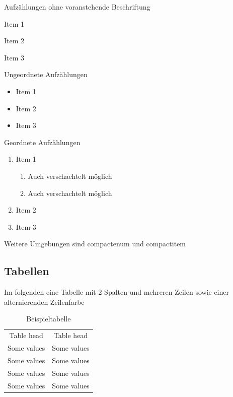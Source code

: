 \documentclass[\maintextsize, \papersize, fleqn, xcolor=dvipsnames]{scrartcl}
\begin{document}
Aufzählungen ohne voranstehende Beschriftung
	
\begin{description}
	\item{Item 1}
	\item{Item 2}
	\item{Item 3}
\end{description}
	
Ungeordnete Aufzählungen
	
\begin{itemize}
	\item{Item 1}
	\item{Item 2}
	\item{Item 3}
\end{itemize}
	
Geordnete Aufzählungen 
	
\begin{enumerate} %
	\item{Item 1}
	\begin{enumerate}
		\item Auch verschachtelt möglich
		\item Auch verschachtelt möglich
	\end{enumerate}
	\item{Item 2}
	\item{Item 3}
\end{enumerate}
	
Weitere Umgebungen sind compactenum und compactitem
	
\subsection{Tabellen}\label{subsec:tables}
	
Im folgenden eine Tabelle mit 2 Spalten und mehreren Zeilen sowie einer alternierenden Zeilenfarbe
	
\begin{table}[H]
	\centering
	\caption{Beispieltabelle}
	\label{tab:test}
	\begin{tabular}{|c|c|}
    	\rowcolor{gray!50}
    	\hline
    	Table head & Table head\\
    	Some values & Some values\\
    	Some values & Some values\\
    	Some values & Some values\\
    	Some values & Some values\\
    	\hline
  	\end{tabular}
\end{table}
	
\end{document}
